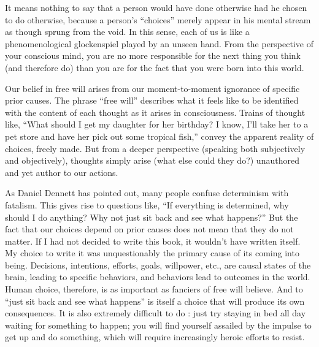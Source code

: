 \documentclass[a4paper,14pt]{extarticle}
\begin{document}
It means nothing to say that a person would have done otherwise had he chosen to do otherwise, because a person’s ``choices'' merely appear in his mental stream as though sprung from the void.
In this sense, each of us is like a phenomenological glockenspiel played by an unseen hand.
From the perspective of your conscious mind, you are no more responsible for the next thing you think (and therefore do) than you are for the fact that you were born into this world.

Our belief in free will arises from our moment-to-moment ignorance of specific prior causes.
The phrase ``free will'' describes what it feels like to be identified with the content of each thought as it arises in consciousness.
Trains of thought like, ``What should I get my daughter for her birthday? I know, I’ll take her to a pet store and have her pick out some tropical fish,'' convey the apparent reality of choices, freely made.
But from a deeper perspective (speaking both subjectively and objectively), thoughts simply arise (what else could they do?) unauthored and yet author to our actions.

As Daniel Dennett has pointed out, many people confuse determinism with fatalism.
This gives rise to questions like, ``If everything is determined, why should I do anything? Why not just sit back and see what happens?''
But the fact that our choices depend on prior causes does not mean that they do not matter.
If I had not decided to write this book, it wouldn’t have written itself.
My choice to write it was unquestionably the primary cause of its coming into being.
Decisions, intentions, efforts, goals, willpower, etc., are causal states of the brain, leading to specific behaviors, and behaviors lead to outcomes in the world.
Human choice, therefore, is as important as fanciers of free will believe.
And to ``just sit back and see what happens'' is itself a choice that will produce its own consequences.
It is also extremely difficult to do :
just try staying in bed all day waiting for something to happen;
you will find yourself assailed by the impulse to get up and do something, which will require increasingly heroic efforts to resist.
\end{document}
